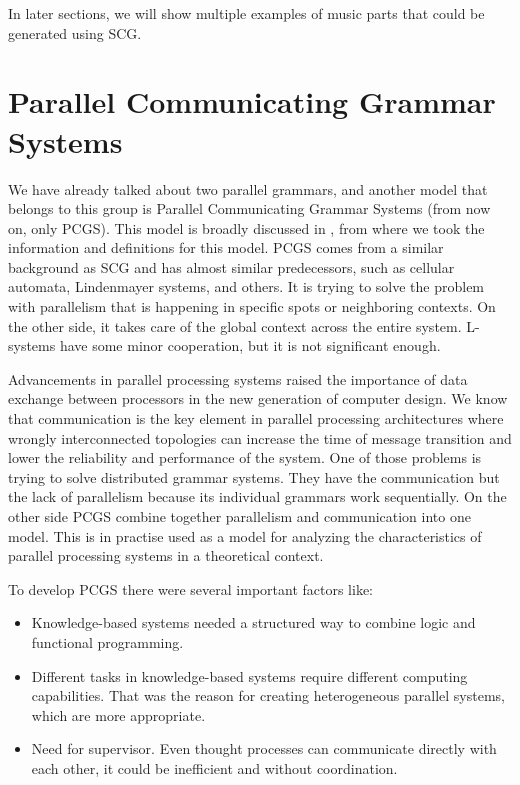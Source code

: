 In later sections, we will show multiple examples of music parts that could be generated using SCG.

\section{Parallel Communicating Grammar Systems}
We have already talked about two parallel grammars, and another model that belongs to this group is Parallel Communicating Grammar Systems (from now on, only PCGS). This model is broadly discussed in \cite{pcgs}, from where we took the information and definitions for this model. PCGS comes from a similar background as SCG and has almost similar predecessors, such as cellular automata, Lindenmayer systems, and others. It is trying to solve the problem with parallelism that is happening in specific spots or neighboring contexts. On the other side, it takes care of the global context across the entire system. L-systems have some minor cooperation, but it is not significant enough. 

Advancements in parallel processing systems raised the importance of data exchange between processors in the new generation of computer design. We know that communication is the key element in parallel processing architectures where wrongly interconnected topologies can increase the time of message transition and lower the reliability and performance of the system. One of those problems is trying to solve distributed grammar systems. They have the communication but the lack of parallelism because its individual grammars work sequentially. On the other side PCGS combine together parallelism and communication into one model. This is in practise used as a model for analyzing the characteristics of parallel processing systems in a theoretical context.

To develop PCGS there were several important factors like: 

\begin{itemize}
    \item{Knowledge-based systems needed a structured way to combine logic and functional programming.}
    \item{Different tasks in knowledge-based systems require different computing capabilities. That was the reason for creating heterogeneous parallel systems, which are more appropriate.}
    \item{Need for supervisor. Even thought processes can communicate directly with each other, it could be inefficient and without coordination.}
\end{itemize}

